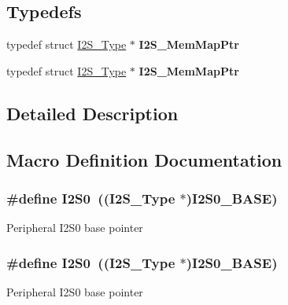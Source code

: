 \subsection*{Typedefs}
\begin{DoxyCompactItemize}
\item 
typedef struct \hyperlink{structI2S__Type}{I2\+S\+\_\+\+Type} $\ast$ {\bfseries I2\+S\+\_\+\+Mem\+Map\+Ptr}\hypertarget{group__I2S__Peripheral__Access__Layer_gad33bb471ea84d7b817c0f390b890984a}{}\label{group__I2S__Peripheral__Access__Layer_gad33bb471ea84d7b817c0f390b890984a}

\item 
typedef struct \hyperlink{structI2S__Type}{I2\+S\+\_\+\+Type} $\ast$ {\bfseries I2\+S\+\_\+\+Mem\+Map\+Ptr}\hypertarget{group__I2S__Peripheral__Access__Layer_gad33bb471ea84d7b817c0f390b890984a}{}\label{group__I2S__Peripheral__Access__Layer_gad33bb471ea84d7b817c0f390b890984a}

\end{DoxyCompactItemize}


\subsection{Detailed Description}


\subsection{Macro Definition Documentation}
\subsubsection[{\texorpdfstring{I2\+S0}{I2S0}}]{\setlength{\rightskip}{0pt plus 5cm}\#define I2\+S0~(({\bf I2\+S\+\_\+\+Type} $\ast$){\bf I2\+S0\+\_\+\+B\+A\+SE})}\hypertarget{group__I2S__Peripheral__Access__Layer_gadb0838291c90975e284e5f6a112f5877}{}\label{group__I2S__Peripheral__Access__Layer_gadb0838291c90975e284e5f6a112f5877}
Peripheral I2\+S0 base pointer 
\subsubsection[{\texorpdfstring{I2\+S0}{I2S0}}]{\setlength{\rightskip}{0pt plus 5cm}\#define I2\+S0~(({\bf I2\+S\+\_\+\+Type} $\ast$){\bf I2\+S0\+\_\+\+B\+A\+SE})}\hypertarget{group__I2S__Peripheral__Access__Layer_gadb0838291c90975e284e5f6a112f5877}{}\label{group__I2S__Peripheral__Access__Layer_gadb0838291c90975e284e5f6a112f5877}
Peripheral I2\+S0 base pointer 
